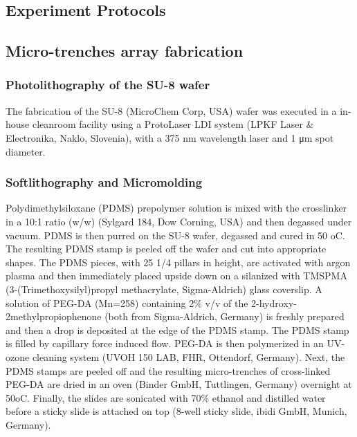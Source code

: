 \documentclass[pdftex,12pt,a4paper]{report}
\begin{document}






\begin{appendices}

\chapter{Experiment Protocols}

\section{Micro-trenches array fabrication} \label{appendix:microtrench}

\subsection*{Photolithography of the SU-8 wafer}

The fabrication of the SU-8 (MicroChem Corp, USA) wafer was executed in a in-house cleanroom facility using a ProtoLaser LDI system (LPKF Laser \& Electronika, Naklo, Slovenia), with a 375 nm wavelength laser and 1 μm spot diameter.

\subsection*{Softlithography and Micromolding}

Polydimethylsiloxane (PDMS) prepolymer solution is mixed with the crosslinker in a 10:1 ratio (w/w) (Sylgard 184, Dow Corning, USA) and then degassed under vacuum. PDMS is then purred on the SU-8 wafer, degassed and cured in 50 oC. The resulting PDMS stamp is peeled off the wafer and cut into appropriate shapes. The PDMS pieces, with 25 1/4 pillars in height, are activated with argon plasma and then immediately placed upside down on a silanized with TMSPMA (3-(Trimethoxysilyl)propyl methacrylate, Sigma-Aldrich) glass coverslip. A solution of PEG-DA (Mn=258) containing 2\% v/v of the 2-hydroxy-2methylpropiophenone (both from Sigma-Aldrich, Germany) is freshly prepared and then a drop is deposited at the edge of the PDMS stamp. The PDMS stamp is filled by capillary force induced flow. PEG-DA is then polymerized in an UV-ozone cleaning system (UVOH 150 LAB, FHR, Ottendorf, Germany). Next, the PDMS stamps are peeled off and the resulting micro-trenches of cross-linked PEG-DA are dried in an oven (Binder GmbH, Tuttlingen, Germany) overnight at 50oC. Finally, the slides are sonicated with 70\% ethanol and distilled water before a sticky slide is attached on top (8-well sticky slide, ibidi GmbH, Munich, Germany).


\end{appendices}
\end{document}
